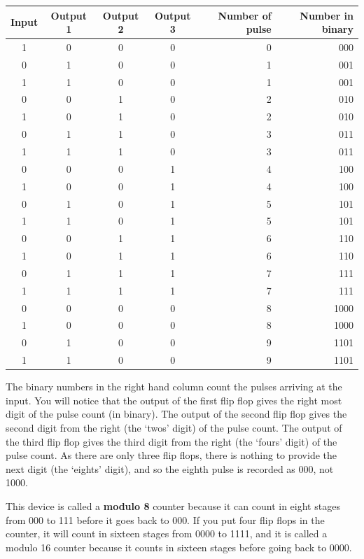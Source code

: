 \begin{center} \begin{tabular}{|c|c|c|c|r|r|} \hline
Input & Output 1 & Output 2 & Output 3 & Number of pulse & Number in binary \\ \hline
1 & 0 & 0 & 0 & 0 & 000 \\ \hline
0 & 1 & 0 & 0 & 1 & 001 \\ \hline
1 & 1 & 0 & 0 & 1 & 001 \\ \hline
0 & 0 & 1 & 0 & 2 & 010 \\ \hline
1 & 0 & 1 & 0 & 2 & 010 \\ \hline
0 & 1 & 1 & 0 & 3 & 011 \\ \hline
1 & 1 & 1 & 0 & 3 & 011 \\ \hline
0 & 0 & 0 & 1 & 4 & 100 \\ \hline
1 & 0 & 0 & 1 & 4 & 100 \\ \hline
0 & 1 & 0 & 1 & 5 & 101 \\ \hline
1 & 1 & 0 & 1 & 5 & 101 \\ \hline
0 & 0 & 1 & 1 & 6 & 110 \\ \hline
1 & 0 & 1 & 1 & 6 & 110 \\ \hline
0 & 1 & 1 & 1 & 7 & 111 \\ \hline
1 & 1 & 1 & 1 & 7 & 111 \\ \hline
0 & 0 & 0 & 0 & 8 & 1000 \\ \hline
1 & 0 & 0 & 0 & 8 & 1000 \\ \hline
0 & 1 & 0 & 0 & 9 & 1101 \\ \hline
1 & 1 & 0 & 0 & 9 & 1101 \\ \hline \end{tabular} \end{center}
               
The binary numbers in the right hand column count the pulses arriving at the input.  You will notice that the output of the first flip flop gives the right most digit of the pulse count (in binary).  The output of the second flip flop gives the second digit from the right (the `twos' digit) of the pulse count.  The output of the third flip flop gives the third digit from the right (the `fours' digit) of the pulse count.  As there are only three flip flops, there is nothing to provide the next digit (the `eights' digit), and so the eighth pulse is recorded as 000, not 1000.

This device is called a {\bf modulo 8} counter because it can count in eight stages from 000 to 111 before it goes back to 000.  If you put four flip flops in the counter, it will count in sixteen stages from 0000 to 1111, and it is called a modulo 16 counter because it counts in sixteen stages before going back to 0000.


